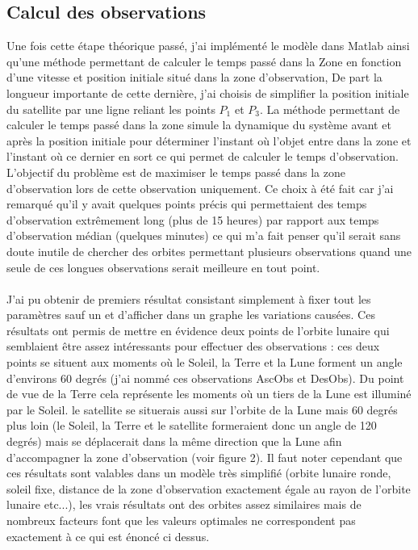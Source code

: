 \documentclass[11pt]{article} %
\begin{document}
		\subsection{Calcul des observations}
		Une fois cette étape théorique passé, j'ai implémenté le modèle dans Matlab ainsi qu'une méthode permettant de calculer le temps passé dans la \gls{Zone} en fonction d'une vitesse et position initiale situé dans la zone d'observation, De part la longueur importante de cette dernière, j'ai choisis de simplifier la position initiale du satellite par une ligne reliant les points $P_1$ et $P_3$. La méthode permettant de calculer le temps passé dans la zone simule la dynamique du système avant et après la position initiale pour déterminer l'instant où l'objet entre dans la zone et l'instant où ce dernier en sort ce qui permet de calculer le temps d'observation. L'objectif du problème est de maximiser le temps passé dans la zone d'observation lors de cette observation uniquement. Ce choix à été fait car j'ai remarqué qu'il y avait quelques points précis qui permettaient des temps d'observation extrêmement long (plus de 15 heures) par rapport aux temps d'observation médian (quelques minutes) ce qui m'a fait penser qu'il serait sans doute inutile de chercher des orbites permettant plusieurs observations quand une seule de ces longues observations serait meilleure en tout point.
		\\ \\
		J'ai pu obtenir de premiers résultat consistant simplement à fixer tout les paramètres sauf un et d'afficher dans un graphe les variations causées. Ces résultats ont permis de mettre en évidence deux points de l'orbite lunaire qui semblaient être assez intéressants pour effectuer des observations : ces deux points se situent aux moments où le Soleil, la Terre et la Lune forment un angle d'environs 60 degrés (j'ai nommé ces observations \gls{AscObs} et \gls{DesObs}). Du point de vue de la Terre cela représente les moments où un tiers de la Lune est illuminé par le Soleil. le satellite se situerais aussi sur l'orbite de la Lune mais 60 degrés plus loin (le Soleil, la Terre et le satellite formeraient donc un angle de 120 degrés) mais se déplacerait dans la même direction que la Lune afin d'accompagner la zone d'observation (voir figure 2). Il faut noter cependant que ces résultats sont valables dans un modèle très simplifié (orbite lunaire ronde, soleil fixe, distance de la zone d'observation exactement égale au rayon de l'orbite lunaire etc...), les vrais résultats ont des orbites assez similaires mais de nombreux facteurs font que les valeurs optimales ne correspondent pas exactement à ce qui est énoncé ci dessus.
		
\end{document}
